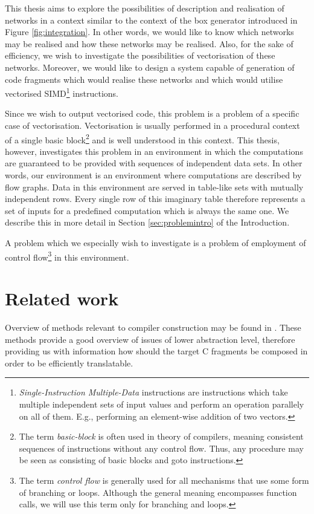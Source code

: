     This thesis aims to explore the possibilities of description and realisation of networks in a context similar to the context of the box generator introduced in Figure \ref{fig:integration}. In other words, we would like to know which networks may be realised and how these networks may be realised. Also, for the sake of efficiency, we wish to investigate the possibilities of vectorisation of these networks. Moreover, we would like to design a system capable of generation of code fragments which would realise these networks and which would utilise vectorised SIMD\footnote{\emph{Single-Instruction Multiple-Data} instructions are instructions which take multiple independent sets of input values and perform an operation parallely on all of them. E.g., performing an element-wise addition of two vectors.} instructions. 

    Since we wish to output vectorised code, this problem is a problem of a specific case of vectorisation. Vectorisation is usually performed in a procedural context of a single basic block\footnote{The term \emph{basic-block} is often used in theory of compilers, meaning consistent sequences of instructions without any control flow. Thus, any procedure may be seen as consisting of basic blocks and goto instructions.} and is well understood in this context. This thesis, however, investigates this problem in an environment in which the computations are guaranteed to be provided with sequences of independent data sets.  In other words, our environment is an environment where computations are described by flow graphs. Data in this environment are served in table-like sets with mutually independent rows. Every single row of this imaginary table therefore represents a set of inputs for a predefined computation which is always the same one. We describe this in more detail in Section \ref{sec:problemintro} of the Introduction.

A problem which we especially wish to investigate is a problem of employment of control flow\footnote{The term \emph{control flow} is generally used for all mechanisms that use some form of branching or loops. Although the general meaning encompasses function calls, we will use this term only for branching and loops.} in this environment.

\section{Related work}
    Overview of methods relevant to compiler construction may be found in \cite{compilers}. These methods provide a good overview of issues of lower abstraction level, therefore providing us with information how should the target C fragments be composed in order to be efficiently translatable.
    
